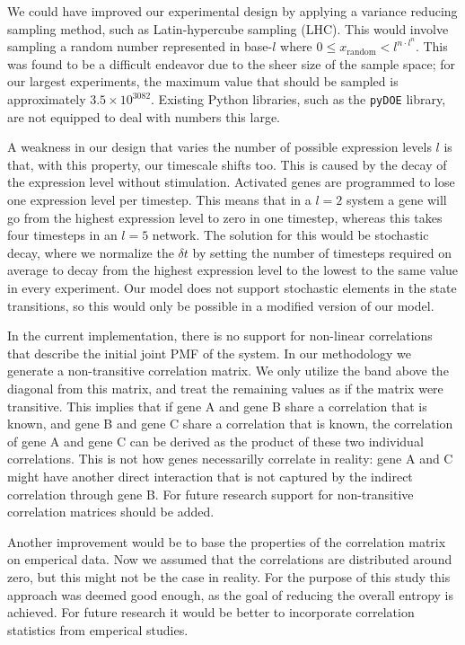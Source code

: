 \documentclass[../main.tex]{subfiles}
\begin{document}
We could have improved our experimental design by applying a variance reducing sampling method, such as Latin-hypercube sampling (LHC).
This would involve sampling a random number represented in base-$l$ where $0 \le x_\mathrm{random} < l^{n \cdot l^n}$.
This was found to be a difficult endeavor due to the sheer size of the sample space; for our largest experiments, the maximum value that should be sampled is approximately $3.5 \times 10^{3082}$.
Existing Python libraries, such as the \texttt{pyDOE} library, are not equipped to deal with numbers this large.

A weakness in our design that varies the number of possible expression levels $l$ is that, with this property, our timescale shifts too.
This is caused by the decay of the expression level without stimulation.
Activated genes are programmed to lose one expression level per timestep.
This means that in a $l=2$ system a gene will go from the highest expression level to zero in one timestep, whereas this takes four timesteps in an $l=5$ network.
The solution for this would be stochastic decay, where we normalize the $\delta t$ by setting the number of timesteps required on average to decay from the highest expression level to the lowest to the same value in every experiment.
Our model does not support stochastic elements in the state transitions, so this would only be possible in a modified version of our model. 

In the current implementation, there is no support for non-linear correlations that describe the initial joint PMF of the system.
In our methodology we generate a non-transitive correlation matrix.
We only utilize the band above the diagonal from this matrix, and treat the remaining values as if the matrix were transitive.
This implies that if gene A and gene B share a correlation that is known, and gene B and gene C share a correlation that is known, the correlation of gene A and gene C can be derived as the product of these two individual correlations.
This is not how genes necessarilly correlate in reality: gene A and C might have another direct interaction that is not captured by the indirect correlation through gene B.
For future research support for non-transitive correlation matrices should be added.

Another improvement would be to base the properties of the correlation matrix on emperical data.
Now we assumed that the correlations are distributed around zero, but this might not be the case in reality.
For the purpose of this study this approach was deemed good enough, as the goal of reducing the overall entropy is achieved.
For future research it would be better to incorporate correlation statistics from emperical studies.
\end{document}
